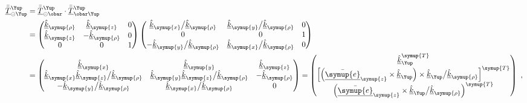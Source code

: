 \begin{subequations} \label{eq:2-72}
\begin{align}
	\bar{\bar{\underline{T}}}^{\Yup}_{\circleddash\Yup} &= \bar{\bar{\underline{T}}}^{\Yup}_{\circleddash\obar} \cdot \bar{\bar{\underline{T}}}^{\Yup}_{\obar\Yup} \label{eq:2-72a}\\ &= \begin{pmatrix} \hat{\underline{k}}_{\symup{\rho}} & \hat{\underline{k}}_{\symup{z}} & 0 \\ \hat{\underline{k}}_{\symup{z}} & -\hat{\underline{k}}_{\symup{\rho}} & 0 \\ 0 & 0 & 1 \end{pmatrix} \begin{pmatrix} \hat{\underline{k}}_{\symup{x}} \big/ \hat{\underline{k}}_{\symup{\rho}} & \hat{\underline{k}}_{\symup{y}} \big/ \hat{\underline{k}}_{\symup{\rho}} & 0 \\ 0 & 0 & 1 \\ -\hat{\underline{k}}_{\symup{y}} \big/ \hat{\underline{k}}_{\symup{\rho}} & \hat{\underline{k}}_{\symup{x}} \big/ \hat{\underline{k}}_{\symup{\rho}} & 0 \end{pmatrix} \label{eq:2-72b}\\ &= \begin{pmatrix} \hat{\underline{k}}_{\symup{x}} & \hat{\underline{k}}_{\symup{y}} & \hat{\underline{k}}_{\symup{z}} \\ \hat{\underline{k}}_{\symup{x}} \hat{\underline{k}}_{\symup{z}} \big/ \hat{\underline{k}}_{\symup{\rho}} & \hat{\underline{k}}_{\symup{y}} \hat{\underline{k}}_{\symup{z}} \big/ \hat{\underline{k}}_{\symup{\rho}} & -\hat{\underline{k}}_{\symup{\rho}} \\ -\hat{\underline{k}}_{\symup{y}} \big/ \hat{\underline{k}}_{\symup{\rho}} & \hat{\underline{k}}_{\symup{x}} \big/ \hat{\underline{k}}_{\symup{\rho}} & 0 \end{pmatrix} = \begin{pmatrix} \hat{\underline{k}}_{\Yup}^{\symup{T}} \\ \left[ \left( \bar{\underline{\symup{e}}}_{\symup{z}} \times \hat{\underline{k}}_{\Yup} \right) \times \hat{\underline{k}}_{\Yup} \big/ \hat{\underline{k}}_{\symup{\rho}} \right] ^{\symup{T}} \\ \left( \bar{\underline{\symup{e}}}_{\symup{z}} \times \hat{\underline{k}}_{\Yup} \big/ \hat{\underline{k}}_{\symup{\rho}} \right) ^{\symup{T}} \end{pmatrix} \label{eq:2-72c}~,
\end{align}
\end{subequations}
